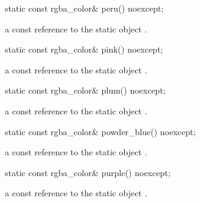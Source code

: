 \begin{itemdecl}
    static const rgba_color& peru() noexcept;
\end{itemdecl}
\begin{itemdescr}
    \pnum
    \returns
    a const reference to the static  object .
\end{itemdescr}

\begin{itemdecl}
    static const rgba_color& pink() noexcept;
\end{itemdecl}
\begin{itemdescr}
    \pnum
    \returns
    a const reference to the static  object .
\end{itemdescr}

\begin{itemdecl}
    static const rgba_color& plum() noexcept;
\end{itemdecl}
\begin{itemdescr}
    \pnum
    \returns
    a const reference to the static  object .
\end{itemdescr}

\begin{itemdecl}
    static const rgba_color& powder_blue() noexcept;
\end{itemdecl}
\begin{itemdescr}
    \pnum
    \returns
    a const reference to the static  object .
\end{itemdescr}

\begin{itemdecl}
    static const rgba_color& purple() noexcept;
\end{itemdecl}
\begin{itemdescr}
    \pnum
    \returns
    a const reference to the static  object .
\end{itemdescr}


